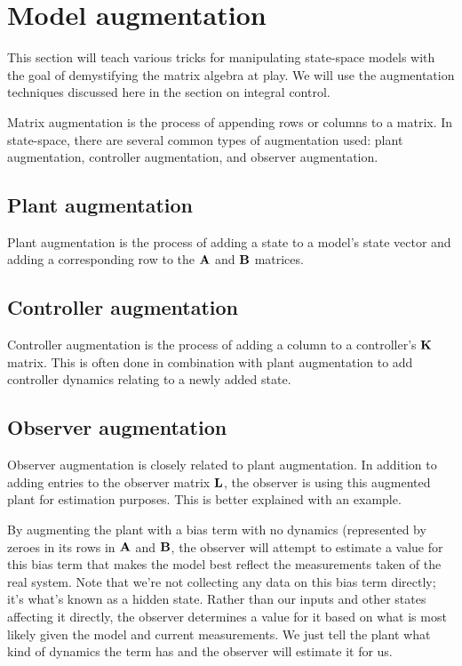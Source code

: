 \section{Model augmentation}

This section will teach various tricks for manipulating state-space
\glspl{model} with the goal of demystifying the matrix algebra at play. We will
use the augmentation techniques discussed here in the section on integral
control.

Matrix augmentation is the process of appending rows or columns to a matrix. In
state-space, there are several common types of augmentation used: \gls{plant}
augmentation, controller augmentation, and \gls{observer} augmentation.

\subsection{Plant augmentation}

Plant augmentation is the process of adding a state to a model's state vector
and adding a corresponding row to the $\mathbf{A}$ and $\mathbf{B}$ matrices.

\subsection{Controller augmentation}

Controller augmentation is the process of adding a column to a controller's
$\mathbf{K}$ matrix. This is often done in combination with \gls{plant}
augmentation to add controller dynamics relating to a newly added \gls{state}.

\subsection{Observer augmentation}

Observer augmentation is closely related to \gls{plant} augmentation. In
addition to adding entries to the \gls{observer} matrix $\mathbf{L}$, the
\gls{observer} is using this augmented \gls{plant} for estimation purposes. This
is better explained with an example.

By augmenting the \gls{plant} with a bias term with no dynamics (represented by
zeroes in its rows in $\mathbf{A}$ and $\mathbf{B}$, the \gls{observer} will attempt
to estimate a value for this bias term that makes the \gls{model} best reflect
the measurements taken of the real \gls{system}. Note that we're not collecting
any data on this bias term directly; it's what's known as a hidden \gls{state}.
Rather than our \glspl{input} and other \glspl{state} affecting it directly, the
\gls{observer} determines a value for it based on what is most likely given the
\gls{model} and current measurements. We just tell the \gls{plant} what kind of
dynamics the term has and the \gls{observer} will estimate it for us.

